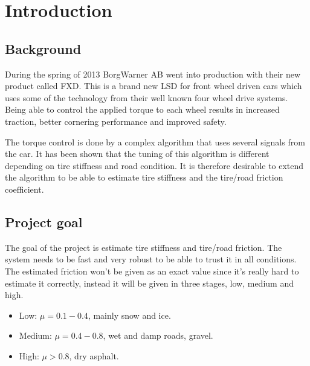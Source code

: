 \chapter{Introduction}

\section{Background}
During the spring of 2013 BorgWarner AB went into production with their new product called FXD. This is a brand new LSD for front wheel driven cars which uses some of the technology from their well known four wheel drive systems. Being able to control the applied torque to each wheel results in increased traction, better cornering performance and improved safety.

The torque control is done by a complex algorithm that uses several signals from the car. It has been shown that the tuning of this algorithm is different depending on tire stiffness and road condition. It is therefore desirable to extend the algorithm to be able to estimate tire stiffness and the tire/road friction coefficient.


\section{Project goal}
The goal of the project is estimate tire stiffness and tire/road friction. The system needs to be fast and very robust to be able to trust it in all conditions. The estimated friction won't be given as an exact value since it's really hard to estimate it correctly, instead it will be given in three stages, low, medium and high.

\begin{itemize}
	\item Low: $ \mu = 0.1-0.4 $, mainly snow and ice.
	\item Medium: $ \mu = 0.4-0.8 $, wet and damp roads, gravel.
	\item High: $ \mu > 0.8 $, dry asphalt.
\end{itemize}
